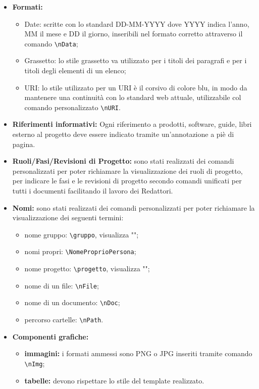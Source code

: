 \documentclass[NormeDiProgetto.tex]{subfiles}
\begin{document}
\begin{itemize}
			\item \textbf{Formati:}
			\begin{itemize}
				\item Date: scritte con lo standard DD-MM-YYYY dove YYYY indica l'anno, MM il mese e DD il giorno, inseribili nel formato corretto attraverso il comando \texttt{\textbackslash nData};
				\item Grassetto: lo stile grassetto va utilizzato per i titoli dei paragrafi e per i titoli degli elementi di un elenco; 
				\item URI: lo stile utilizzato per un URI è il corsivo di colore blu, in modo da mantenere una continuità con lo standard web attuale, utilizzabile col comando personalizzato  \texttt{\textbackslash nURI}.
			\end{itemize}
			
			\item \textbf{Riferimenti informativi:}
			Ogni riferimento a prodotti, software, guide, libri esterno al progetto deve essere indicato tramite un'annotazione a piè di pagina.			
			
			\item \textbf{Ruoli/Fasi/Revisioni di Progetto:} sono stati realizzati dei comandi personalizzati per poter richiamare la visualizzazione dei ruoli di progetto, per indicare le fasi e le revisioni di progetto secondo comandi unificati per tutti i documenti facilitando il lavoro dei Redattori.
			
			\item \textbf{Nomi:} sono stati realizzati dei comandi personalizzati per poter richiamare la visualizzazione dei seguenti termini:
			\begin{itemize}
				\item nome gruppo: \texttt{\textbackslash gruppo}, visualizza "\gruppo";
				\item nomi propri: \texttt{\textbackslash NomeProprioPersona};
				\item nome progetto: \texttt{\textbackslash progetto}, visualizza "\progetto";
				\item nome di un file: \texttt{\textbackslash nFile};
				\item nome di un documento: \texttt{\textbackslash nDoc};
				\item percorso cartelle: \texttt{\textbackslash nPath}.
			\end{itemize}
		
			\item \textbf{Componenti grafiche:}
			 \begin{itemize}
			 	\item \textbf{immagini:} i formati ammessi sono PNG o JPG inseriti tramite comando \texttt{\textbackslash nImg}; 
			 	\item \textbf{tabelle:} devono rispettare lo stile del template realizzato.
			 \end{itemize}
			
		\end{itemize}
	
\end{document}
